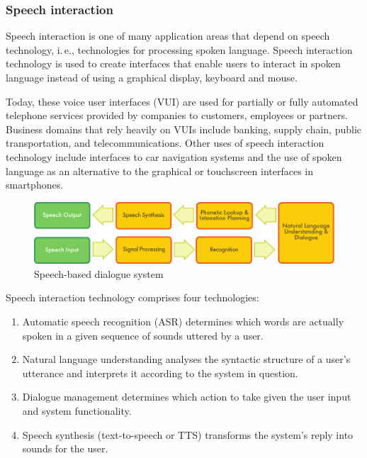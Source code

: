 \begin{multicols}{2}
\subsubsection{Speech interaction}

Speech interaction is one of many application areas that depend on speech technology, i.\,e., technologies for processing spoken language. Speech interaction technology is used to create interfaces that enable users to interact in spoken language instead of using a graphical display, keyboard and mouse. 


Today, these voice user interfaces (VUI) are used for partially or fully automated telephone services provided by companies to customers, employees or partners. Business domains that rely heavily on VUIs include banking, supply chain, public transportation, and telecommunications. Other uses of speech interaction technology include interfaces to car navigation systems and the use of spoken language as an alternative to the graphical or touchscreen interfaces in smartphones.

\begin{figure}[htb]
  \center
  \includegraphics[width=\textwidth]{../_media/english/simple_speech-based_dialogue_architecture}
  \caption{Speech-based dialogue system}
\label{fig:dialoguearch_en}
\end{figure}

Speech interaction technology comprises four technologies: 

\begin{enumerate}
  \item Automatic speech recognition (ASR) determines which words are actually spoken in a given sequence of sounds uttered by a user.
  \item Natural language understanding analyses the syntactic structure of a user's utterance and interprets it according to the system in question.
  \item Dialogue management determines which action to take given the user input and system functionality.    
  \item Speech synthesis (text-to-speech or TTS) transforms the system's reply into sounds for the user.
\end{enumerate}


\end{multicols}
